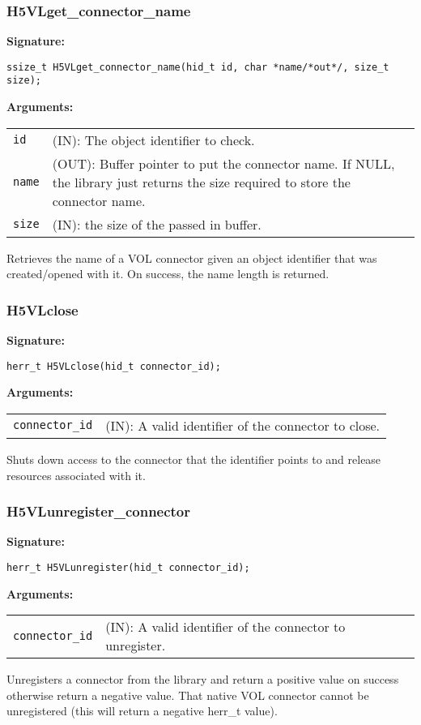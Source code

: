\subsubsection{H5VLget\_connector\_name}
\begin{mdframed}[style=bgbox]
\textbf{Signature:}
\begin{lstlisting}
ssize_t H5VLget_connector_name(hid_t id, char *name/*out*/, size_t size);
\end{lstlisting}

\textbf{Arguments:}\\
\begin{tabular}{l p{13.5cm}}
  {\tt id} & (IN): The object identifier to check.\\
  {\tt name} & (OUT): Buffer pointer to put the connector name. If NULL, the library just returns the size required to store the connector name.\\
  {\tt size} & (IN): the size of the passed in buffer.\\
\end{tabular}
\end{mdframed}
Retrieves the name of a VOL connector given an object identifier that was created/opened with it. On success, the name length is returned.\bigskip


\subsubsection{H5VLclose}
\begin{mdframed}[style=bgbox]
\textbf{Signature:}
\begin{lstlisting}
herr_t H5VLclose(hid_t connector_id);
\end{lstlisting}

\textbf{Arguments:}\\
\begin{tabular}{l p{13.5cm}}
 {\tt connector\_id} & (IN): A valid identifier of the connector to close.\\
\end{tabular}
\end{mdframed}
Shuts down access to the connector that the identifier points to and release resources associated with it.\bigskip


\subsubsection{H5VLunregister\_connector}
\begin{mdframed}[style=bgbox]
\textbf{Signature:}
\begin{lstlisting}
herr_t H5VLunregister(hid_t connector_id);
\end{lstlisting}
\textbf{Arguments:}\\
\begin{tabular}{l p{13.5cm}}
  {\tt connector\_id} & (IN): A valid identifier of the connector to unregister.\\
\end{tabular}
\end{mdframed}
Unregisters a connector from the library and return a positive value on success otherwise return a negative value. That native VOL connector cannot be unregistered (this will return a negative herr\_t value).\bigskip


